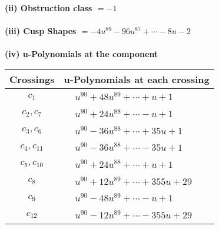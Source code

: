 \documentclass[1p]{elsarticle_modified}
\theoremstyle{definition}
\begin{document}
\flushleft \textbf{(ii) Obstruction class $= -1$}\\~\\
\flushleft \textbf{(iii) Cusp Shapes $= -4 u^{89}-96 u^{87}+\cdots-8 u-2$}\\~\\
\newpage\renewcommand{\arraystretch}{1}
\flushleft \textbf{(iv) u-Polynomials at the component}\newline \\
\begin{tabular}{m{50pt}|m{274pt}}
Crossings & \hspace{64pt}u-Polynomials at each crossing \\
\hline $$\begin{aligned}c_{1}\end{aligned}$$&$\begin{aligned}
&u^{90}+48 u^{89}+\cdots+u+1
\end{aligned}$\\
\hline $$\begin{aligned}c_{2},c_{7}\end{aligned}$$&$\begin{aligned}
&u^{90}+24 u^{88}+\cdots- u+1
\end{aligned}$\\
\hline $$\begin{aligned}c_{3},c_{6}\end{aligned}$$&$\begin{aligned}
&u^{90}-36 u^{88}+\cdots+35 u+1
\end{aligned}$\\
\hline $$\begin{aligned}c_{4},c_{11}\end{aligned}$$&$\begin{aligned}
&u^{90}-36 u^{88}+\cdots-35 u+1
\end{aligned}$\\
\hline $$\begin{aligned}c_{5},c_{10}\end{aligned}$$&$\begin{aligned}
&u^{90}+24 u^{88}+\cdots+u+1
\end{aligned}$\\
\hline $$\begin{aligned}c_{8}\end{aligned}$$&$\begin{aligned}
&u^{90}+12 u^{89}+\cdots+355 u+29
\end{aligned}$\\
\hline $$\begin{aligned}c_{9}\end{aligned}$$&$\begin{aligned}
&u^{90}-48 u^{89}+\cdots- u+1
\end{aligned}$\\
\hline $$\begin{aligned}c_{12}\end{aligned}$$&$\begin{aligned}
&u^{90}-12 u^{89}+\cdots-355 u+29
\end{aligned}$\\
\hline
\end{tabular}\\~\\
\end{document}
